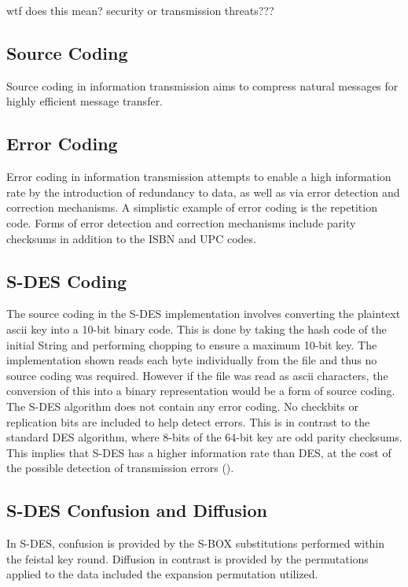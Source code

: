 \documentclass[]{article}
\begin{document}
wtf does this mean? security or transmission threats???

\subsection*{Source Coding}

Source coding in information transmission aims to compress natural messages for highly efficient message transfer.

\subsection*{Error Coding}

Error coding in information transmission attempts to enable a high information rate by the introduction of redundancy to data, as well as via error detection and correction mechanisms. A simplistic example of error coding is the repetition code. Forms of error detection and correction mechanisms include parity checksums in addition to the ISBN and UPC codes.

\subsection*{S-DES Coding}

The source coding in the S-DES implementation involves converting the plaintext ascii key into a 10-bit binary code. This is done by taking the hash code of the initial String and performing chopping to ensure a maximum 10-bit key. The implementation shown reads each byte individually from the file and thus no source coding was required. However if the file was read as ascii characters, the conversion of this into a binary representation would be a form of source coding.\\

The S-DES algorithm does not contain any error coding. No checkbits or replication bits are included to help detect errors. This is in contrast to the standard DES algorithm, where 8-bits of the 64-bit key are odd parity checksums. This implies that S-DES has a higher information rate than DES, at the cost of the possible detection of transmission errors (\cite{alttext}).

\subsection*{S-DES Confusion and Diffusion}

In S-DES, confusion is provided by the S-BOX substitutions performed within the feistal key round. Diffusion in contrast is provided by the permutations applied to the data included the expansion permutation utilized.
\end{document}
